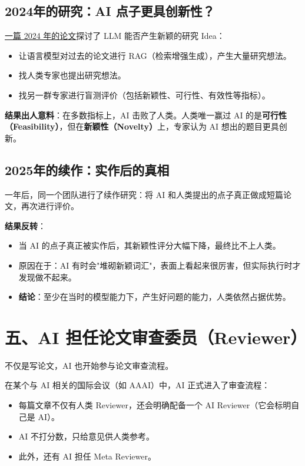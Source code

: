 \documentclass[12pt,a4paper]{article}
\begin{document}
\subsection{2024年的研究：AI 点子更具创新性？}

\href{https://arxiv.org/abs/2409.04109}{一篇 2024 年的论文}探讨了 LLM 能否产生新颖的研究 Idea：
\begin{itemize}[leftmargin=2em]
  \item 让语言模型对过去的论文进行 RAG（检索增强生成），产生大量研究想法。
  \item 找人类专家也提出研究想法。
  \item 找另一群专家进行盲测评价（包括新颖性、可行性、有效性等指标）。
\end{itemize}

\textbf{结果出人意料}：在多数指标上，AI 击败了人类。人类唯一赢过 AI 的是\textbf{可行性（Feasibility）}，但在\textbf{新颖性（Novelty）}上，专家认为 AI 想出的题目更具创新。

\subsection{2025年的续作：实作后的真相}

一年后，同一个团队进行了续作研究：将 AI 和人类提出的点子真正做成短篇论文，再次进行评价。

\textbf{结果反转}：
\begin{itemize}[leftmargin=2em]
  \item 当 AI 的点子真正被实作后，其新颖性评分大幅下降，最终比不上人类。
  \item 原因在于：AI 有时会"堆砌新颖词汇"，表面上看起来很厉害，但实际执行时才发现做不起来。
  \item \textbf{结论}：至少在当时的模型能力下，产生好问题的能力，人类依然占据优势。
\end{itemize}

\section{五、AI 担任论文审查委员（Reviewer）}

不仅是写论文，AI 也开始参与论文审查流程。

在某个与 AI 相关的国际会议（如 AAAI）中，AI 正式进入了审查流程：
\begin{itemize}[leftmargin=2em]
  \item 每篇文章不仅有人类 Reviewer，还会明确配备一个 AI Reviewer（它会标明自己是 AI）。
  \item AI 不打分数，只给意见供人类参考。
  \item 此外，还有 AI 担任 Meta Reviewer。
\end{itemize}
\end{document}
